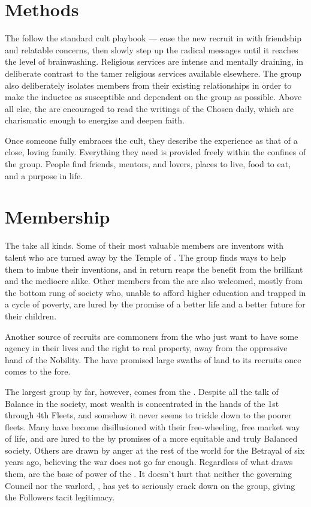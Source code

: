\documentclass[blue]{GL2020}
\begin{document}
\section*{Methods}
The \pGoaties{} follow the standard cult playbook — ease the new recruit in with friendship and relatable concerns, then slowly step up the radical messages until it reaches the level of brainwashing. Religious services are intense and mentally draining, in deliberate contrast to the tamer religious services available elsewhere. The group also deliberately isolates members from their existing relationships in order to make the inductee as susceptible and dependent on the group as possible. Above all else, the \pGoaties{} are encouraged to read the writings of the Chosen daily, which are charismatic enough to energize and deepen faith.

Once someone fully embraces the cult, they describe the experience as that of a close, loving family. Everything they need is provided freely within the confines of the group. People find friends, mentors, and lovers, places to live, food to eat, and a purpose in life.

\section*{Membership}
The \pGoaties{} take all kinds. Some of their most valuable members are \pTech{} inventors with talent who are turned away by the Temple of \cTechGod{}. The group finds ways to help them to imbue their inventions, and in return reaps the benefit from the brilliant and the mediocre alike. Other members from the \pTech{} are also welcomed, mostly from the bottom rung of society who, unable to afford higher education and trapped in a cycle of poverty, are lured by the promise of a better life and a better future for their children.

Another source of recruits are commoners from the \pFarm{} who just want to have some agency in their lives and the right to real property, away from the oppressive hand of the Nobility. The \pGoaties{} have promised large swaths of land to its \pFarm{} recruits once \cGenesis{} comes to the fore.

The largest group by far, however, comes from the \pShip{}. Despite all the talk of Balance in the \pShip{} society, most wealth is concentrated in the hands of the 1st through 4th Fleets, and somehow it never seems to trickle down to the poorer fleets. Many \pShippies{} have become disillusioned with their free-wheeling, free market way of life, and are lured to the \pGoaties{} by promises of a more equitable and truly Balanced society. Others are drawn by anger at the rest of the world for the Betrayal of six years ago, believing the war does not go far enough. Regardless of what draws them, \pShippies{} are the base of power of the \pGoaties{}. It doesn't hurt that neither the governing Council nor the warlord, \cLoud{}, has yet to seriously crack down on the group, giving the Followers tacit legitimacy.
\end{document}
